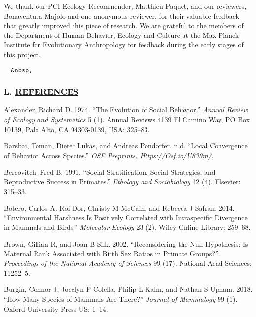 \documentclass[]{article}
\begin{document}
We thank our PCI Ecology Recommender, Matthieu Paquet, and our
reviewers, Bonaventura Majolo and one anonymous reviewer, for their
valuable feedback that greatly improved this piece of research. We are
grateful to the members of the Department of Human Behavior, Ecology and
Culture at the Max Planck Institute for Evolutionary Anthropology for
feedback during the early stages of this project.

\begin{verbatim}
  &nbsp; 
\end{verbatim}

\hypertarget{l.-references}{%
\subsubsection*{\texorpdfstring{L.
\href{MyLibrary.bib}{REFERENCES}}{L. REFERENCES}}\label{l.-references}}

\hypertarget{refs}{}
\leavevmode\hypertarget{ref-alexander1974evolution}{}%
Alexander, Richard D. 1974. ``The Evolution of Social Behavior.''
\emph{Annual Review of Ecology and Systematics} 5 (1). Annual Reviews
4139 El Camino Way, PO Box 10139, Palo Alto, CA 94303-0139, USA:
325--83.

\leavevmode\hypertarget{ref-barsbai2020similarity}{}%
Barsbai, Toman, Dieter Lukas, and Andreas Pondorfer. n.d. ``Local
Convergence of Behavior Across Species.'' \emph{OSF Preprints,
Https://Osf.io/U839m/}.

\leavevmode\hypertarget{ref-bercovitch1991social}{}%
Bercovitch, Fred B. 1991. ``Social Stratification, Social Strategies,
and Reproductive Success in Primates.'' \emph{Ethology and Sociobiology}
12 (4). Elsevier: 315--33.

\leavevmode\hypertarget{ref-botero2014environmental}{}%
Botero, Carlos A, Roi Dor, Christy M McCain, and Rebecca J Safran. 2014.
``Environmental Harshness Is Positively Correlated with Intraspecific
Divergence in Mammals and Birds.'' \emph{Molecular Ecology} 23 (2).
Wiley Online Library: 259--68.

\leavevmode\hypertarget{ref-brown2002reconsidering}{}%
Brown, Gillian R, and Joan B Silk. 2002. ``Reconsidering the Null
Hypothesis: Is Maternal Rank Associated with Birth Sex Ratios in Primate
Groups?'' \emph{Proceedings of the National Academy of Sciences} 99
(17). National Acad Sciences: 11252--5.

\leavevmode\hypertarget{ref-burgin2018many}{}%
Burgin, Connor J, Jocelyn P Colella, Philip L Kahn, and Nathan S Upham.
2018. ``How Many Species of Mammals Are There?'' \emph{Journal of
Mammalogy} 99 (1). Oxford University Press US: 1--14.
\end{document}
